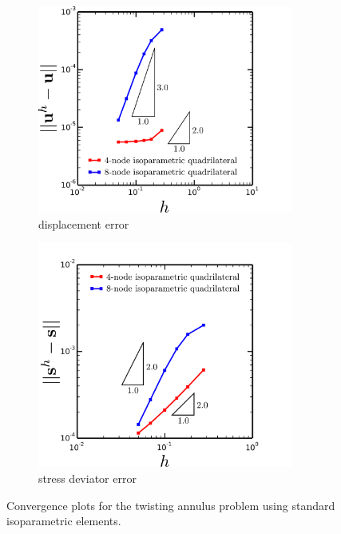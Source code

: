 \begin{figure}[!h]
  \centering
    \begin{subfigure}[b]{0.49\linewidth}
            \centering
            \includegraphics[width=3.3in]{figures/quad_l2_error.pdf}
    			\caption{displacement error \label{fig:quad_l2_error}}
    \end{subfigure}
	\begin{subfigure}[b]{0.49\linewidth}
            \centering
            \includegraphics[width=3.3in]{figures/quad_h1_error.pdf}
    			\caption{stress deviator error \label{fig:quad_h1_error}}
    \end{subfigure} \caption{Convergence plots for the twisting annulus problem using standard isoparametric elements.}
  \label{fig:quad_error}
\end{figure}

